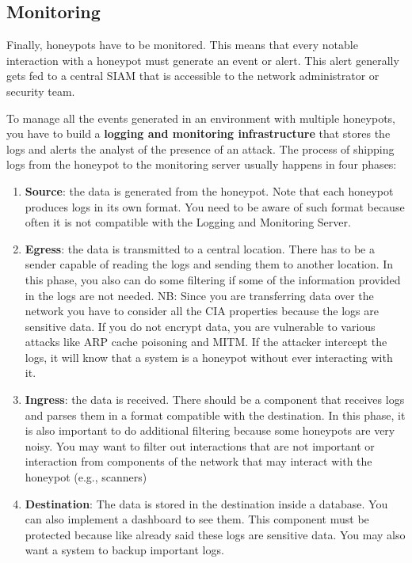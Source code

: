 \documentclass[epsfig,a4paper,11pt,titlepage,oneside,openany]{book}
\begin{document}
\begin{itemize}
\section{Monitoring}

Finally, honeypots have to be monitored. This means that every notable interaction with a honeypot must generate an event or alert. This alert generally gets fed to a central SIAM that is accessible to the network administrator or security team.

To manage all the events generated in an environment with multiple honeypots, you have to build a \textbf{logging and monitoring infrastructure} that stores the logs and alerts the analyst of the presence of an attack. The process of shipping logs from the honeypot to the monitoring server usually happens in four phases:
\begin{enumerate}
\item \textbf{Source}: the data is generated from the honeypot. Note that each honeypot produces logs in its own format. You need to be aware of such format because often it is not compatible with the Logging and Monitoring Server.
\item \textbf{Egress}: the data is transmitted to a central location. There has to be a sender capable of reading the logs and sending them to another location. In this phase, you also can do some filtering  if some of the information provided in the logs are not needed.
NB: Since you are transferring data over the network you have to consider all the CIA properties because the logs are sensitive data. If you do not encrypt data, you are vulnerable to various attacks like ARP cache poisoning and MITM. If the attacker intercept the logs, it will know that a system is a honeypot without ever interacting with it.
\item	\textbf{Ingress}: the data is received. There should be a component that receives logs and parses them in a format compatible with the destination. In this phase, it is also important to do additional filtering because  some honeypots are very noisy. You may want to filter out interactions that are not important or interaction from components of the network that may interact with the honeypot (e.g., scanners)
\item \textbf{Destination}: The data is stored in the destination inside a database.  You can also implement a dashboard to see them. This component must be protected because like already said these logs are sensitive data. You may also want a system to backup important logs.
\end{enumerate}


\end{itemize}
\end{document}
